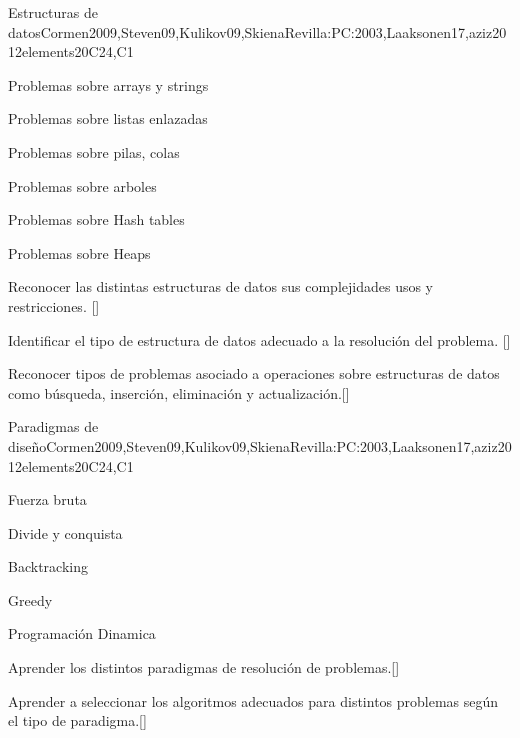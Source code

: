 \begin{syllabus}
  \begin{unit}{Estructuras de datos}{}{Cormen2009,Steven09,Kulikov09,SkienaRevilla:PC:2003,Laaksonen17,aziz2012elements}{20}{C24,C1}
    \begin{topics}
      \item Problemas sobre arrays y strings
      \item Problemas sobre listas enlazadas
      \item Problemas sobre pilas, colas
      \item Problemas sobre arboles
      \item Problemas sobre Hash tables
      \item Problemas sobre Heaps 
    \end{topics}
    \begin{learningoutcomes}
        \item Reconocer las distintas estructuras de datos sus complejidades usos y restricciones. [\Usage]
        \item Identificar el tipo de estructura de datos adecuado a la resolución del problema. [\Usage]
        \item Reconocer tipos de problemas asociado a operaciones sobre estructuras de datos como búsqueda, inserción, eliminación y actualización.[\Usage]
    \end{learningoutcomes}
  \end{unit}
  
  \begin{unit}{Paradigmas de diseño}{}{Cormen2009,Steven09,Kulikov09,SkienaRevilla:PC:2003,Laaksonen17,aziz2012elements}{20}{C24,C1}
    \begin{topics}
      \item Fuerza bruta
      \item Divide y conquista
      \item Backtracking
      \item Greedy
      \item Programación Dinamica
    \end{topics}
    \begin{learningoutcomes}
        \item Aprender los distintos paradigmas de resolución de problemas.[\Usage]
        \item Aprender a seleccionar los algoritmos adecuados para distintos problemas según el tipo de paradigma.[\Usage]
    \end{learningoutcomes}
  \end{unit}
  

\end{syllabus}
